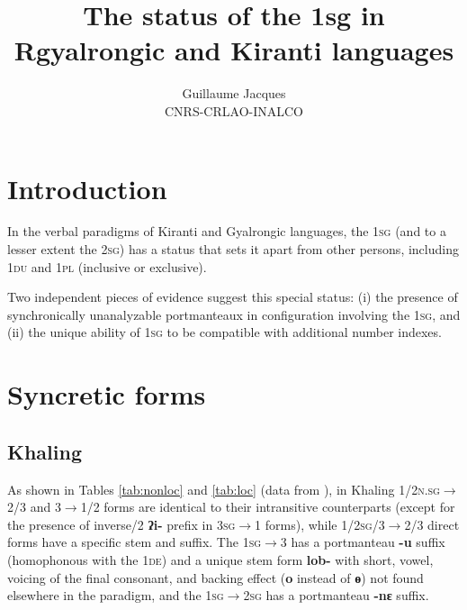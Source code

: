 \documentclass{article}
\newcommand{\ipa}[1]{{\phon\textbf{#1}}}
\begin{document}
 
\title{The status of the 1sg in Rgyalrongic and Kiranti
languages}
\author{Guillaume Jacques\\ CNRS-CRLAO-INALCO}
\maketitle

\sloppy
\section*{Introduction}
In the verbal paradigms of Kiranti and Gyalrongic languages, the \textsc{1sg} (and to a lesser extent the \textsc{2sg}) has a status that sets it apart from other persons, including \textsc{1du} and \textsc{1pl} (inclusive or exclusive).

Two independent pieces of evidence suggest this special status: (i) the presence of synchronically unanalyzable portmanteaux in configuration involving the \textsc{1sg}, and (ii) the unique ability of \textsc{1sg} to be compatible with additional number indexes.

\section{Syncretic forms}

\subsection{Khaling}
 
As shown in Tables \ref{tab:nonloc} and \ref{tab:loc} (data from \citealt[1102]{jacques12khaling}), in Khaling \textsc{1/2n.sg}$\rightarrow$2/3 and 3$\rightarrow$1/2  forms are identical to their intransitive counterparts (except for the presence of inverse/2 \ipa{ʔi-} prefix in \textsc{3sg}$\rightarrow$1 forms), while \textsc{1/2sg/3}$\rightarrow$2/3 direct forms have a specific stem and suffix. The \textsc{1sg$\rightarrow$3} has a portmanteau \ipa{-u} suffix (homophonous with the \textsc{1de}) and a unique stem form \ipa{lob-} with short, vowel, voicing of the final consonant, and backing effect (\ipa{o} instead of \ipa{ɵ}) not found elsewhere in the paradigm, and the \textsc{1sg$\rightarrow$2sg} has a portmanteau \ipa{-nɛ} suffix.
\end{document}
